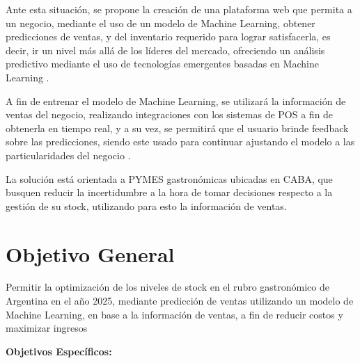 Ante esta situación, se propone la creación de una plataforma web que permita a un negocio, mediante el uso de un modelo de Machine Learning, obtener predicciones de ventas, y del inventario requerido para lograr satisfacerla, es decir, ir un nivel más allá de los líderes del mercado, ofreciendo un análisis predictivo mediante el uso de tecnologías emergentes basadas en Machine Learning \parencite{posch2022bayesian}.

A fin de entrenar el modelo de Machine Learning, se utilizará la información de ventas del negocio, realizando integraciones con los sistemas de POS a fin de obtenerla en tiempo real, y a su vez, se permitirá que el usuario brinde feedback sobre las predicciones, siendo este usado para continuar ajustando el modelo a las particularidades del negocio \parencite{soto2024futuro}.

La solución está orientada a PYMES gastronómicas ubicadas en CABA, que busquen reducir la incertidumbre a la hora de tomar decisiones respecto a la gestión de su stock, utilizando para esto la información de ventas.

\section{Objetivo General}

Permitir la optimización de los niveles de stock en el rubro gastronómico de Argentina en el año 2025, mediante predicción de ventas utilizando un modelo de Machine Learning, en base a la información de ventas, a fin de reducir costos y maximizar ingresos

\noindent\textbf{Objetivos Específicos:}

